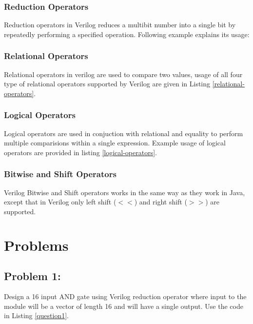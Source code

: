 \documentclass[a4paper,10pt]{article}
\theoremstyle{mytheor}
\newcommand{
  \insertverilog}[3]{
  
}
\begin{document}
\subsubsection*{Reduction Operators}
Reduction operators in Verilog reduces a multibit number into a single
bit by repeatedly performing a specified operation. Following example 
explains its usage: 
\insertverilog{./verilog_files/reductionOperators.v}{reduction-operators}{\text{Functioning of reduction operator}}
 
\subsubsection*{Relational Operators}
Relational operators in verilog are used to compare two values, usage
of all four type of relational operators supported by Verilog are
given in Listing \ref{relational-operators}.
\insertverilog{./verilog_files/relationalOperators.v}{relational-operators}{\text{Functioning of relational operator}}
  
\subsubsection*{Logical Operators}
Logical operators are used in conjuction with relational and equality
to perform multiple comparisions within a single expression.
Example usage of logical operators are provided in listing  \ref{logical-operators}.
\insertverilog{./verilog_files/logicalOperators.v}{logical-operators}{\text{Functioning of logical operator}}

\subsubsection*{Bitwise and Shift Operators}
Verilog Bitwise and Shift operators works in the same way as they work
in Java, except that in Verilog only left shift ($<<$) and right shift
($>>$) are supported.

\section*{Problems}
\subsection*{Problem 1:}
Design a 16 input AND gate using Verilog reduction operator where input to the module will be a vector of length 16 and will have a single output.
Use the code in Listing \ref{question1}. 
\insertverilog{./verilog_files/question1.v}{question1}{\text{Question 1}}
\end{document}
